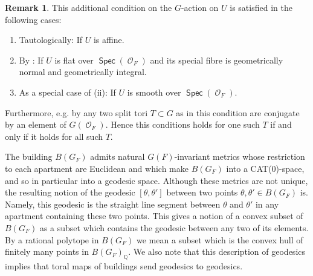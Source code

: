 \documentclass{article}
\DeclareMathOperator{\CO}{\mathcal{O}}
\DeclareMathOperator{\Spec}{\mathsf{Spec}}
\newcommand{\BQ}{{\mathbb{Q}}}
\theoremstyle{definition}
\newtheorem{rmk}[definition]{Remark}
\theoremstyle{plain}
\begin{document}
\begin{rmk}
    This additional condition on the $G$-action on $U$ is satisfied in the following cases:
    \begin{enumerate}
        \item Tautologically: If $U$ is affine.
        \item By \cite[3.11]{MR0387294}: If $U$ is flat over $\Spec(\CO_F)$ and its special fibre is geometrically normal and geometrically integral. 
        \item As a special case of (ii): If $U$ is smooth over $\Spec(\CO_F)$.
    \end{enumerate}

    Furthermore, e.g. by \cite[3.18]{Ziegler22} any two split tori $T \subset G$ as in this condition are conjugate by an element of $G(\CO_F)$. Hence this conditions holds for one such $T$ if and only if it holds for all such $T$. 
\end{rmk}


The building $B(G_F)$ admits natural $G(F)$-invariant metrics whose restriction to each apartment are Euclidean and which make $B(G_F)$ into a CAT(0)-space, and so in particular into a geodesic space. Although these metrics are not unique, the resulting notion of the geodesic $[\theta,\theta']$ between two points $\theta, \theta' \in B(G_F)$ is. Namely, this geodesic is the straight line segment between $\theta$ and $\theta'$ in any apartment containing these two points. This gives a notion of a convex subset of $B(G_F)$ as a subset which contains the geodesic between any two of its elements. By a rational polytope in $B(G_F)$ we mean a subset which is the convex hull of finitely many points in $B(G_F)_\BQ$. We also note that this description of geodesics implies that toral maps of buildings send geodesics to geodesics.
\end{document}
